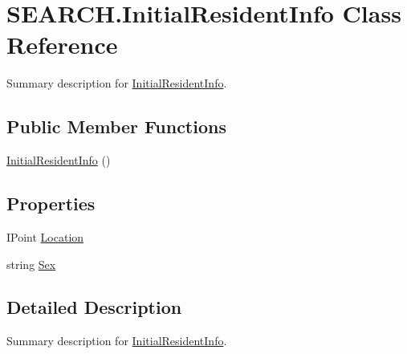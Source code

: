 \hypertarget{class_s_e_a_r_c_h_1_1_initial_resident_info}{\section{S\-E\-A\-R\-C\-H.\-Initial\-Resident\-Info Class Reference}
\label{class_s_e_a_r_c_h_1_1_initial_resident_info}
}


Summary description for \hyperlink{class_s_e_a_r_c_h_1_1_initial_resident_info}{Initial\-Resident\-Info}.  


\subsection*{Public Member Functions}
\begin{DoxyCompactItemize}
\item 
\hyperlink{class_s_e_a_r_c_h_1_1_initial_resident_info_a4a02216bc1d8b3e6cc728cc7c0037a48}{Initial\-Resident\-Info} ()
\end{DoxyCompactItemize}
\subsection*{Properties}
\begin{DoxyCompactItemize}
\item 
I\-Point \hyperlink{class_s_e_a_r_c_h_1_1_initial_resident_info_a9d0dd0f308b66c00fdd38827085e581b}{Location}
\item 
string \hyperlink{class_s_e_a_r_c_h_1_1_initial_resident_info_ade021018937f83c61e36e6bccc15d485}{Sex}
\end{DoxyCompactItemize}


\subsection{Detailed Description}
Summary description for \hyperlink{class_s_e_a_r_c_h_1_1_initial_resident_info}{Initial\-Resident\-Info}. 



